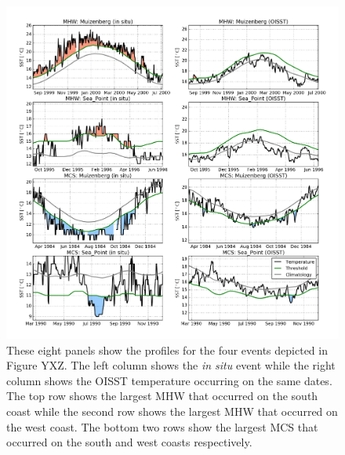 \documentclass[a4paper,10pt,review]{elsarticle}
\begin{document}
\begin{figure}
\centering \includegraphics[width=1.0\textwidth]{figure3.png}
\caption{These eight panels show the profiles for the four events depicted in Figure YXZ. The left column shows the \emph{in situ} event while the right column shows the OISST temperature occurring on the same dates. The top row shows the largest MHW that occurred on the south coast while the second row shows the largest MHW that occurred on the west coast. The bottom two rows show the largest MCS that occurred on the south and west coasts respectively.} \label{fig:Figure3}
\end{figure}
\end{document}
